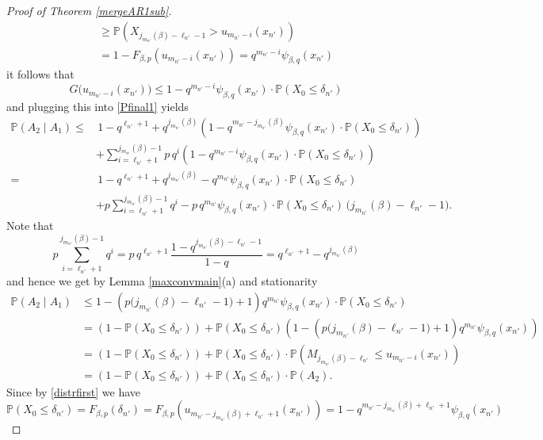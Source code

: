 \documentclass[12pt]{amsart}
\theoremstyle{definition}
\theoremstyle{remark}
\newcommand{\Pm}{{\mathbb P}}
\numberwithin{equation}{section}
\begin{document}
\begin{proof}[Proof of Theorem \ref{mergeAR1sub}]
\begin{align*}
& \quad\geq\Pm\left(X_{j_{m_{n'}}(\beta)-\ell_{n'}-1}>u_{m_{n'}-i}(x_{n'})\right)\\
& \quad=1-F_{\beta,p}(u_{m_{n'}-i}(x_{n'}))=q^{m_{n'}-i}\psi_{\beta,q}(x_{n'})
\end{align*}
it follows that
$$G\big(u_{m_{n'}-i}(x_{n'})\big)\leq 1-q^{m_{n'}-i}\psi_{\beta,q}(x_{n'})\cdot\Pm\left(X_{0}\leq\delta_{n'}\right)$$
and plugging this into \eqref{Pfinal1} yields
\begin{align*}
\Pm(A_2\mid A_1)\leq & \,1-q^{\ell_{n'}+1}+q^{j_{m_{n'}}(\beta)}\left(1-q^{m_{n'}-j_{m_{n'}}(\beta)}\psi_{\beta,q}(x_{n'})\cdot\Pm\left(X_{0}\leq\delta_{n'}\right)\right)\\
& +\sum_{i=\ell_{n'}+1}^{j_{m_{n'}}(\beta)-1} p\,q^i \left(1-q^{m_{n'}-i}\psi_{\beta,q}(x_{n'})\cdot\Pm\left(X_{0}\leq\delta_{n'}\right)\right)\\
= & \,1-q^{\ell_{n'}+1}+q^{j_{m_{n'}}(\beta)}-q^{m_{n'}}\psi_{\beta,q}(x_{n'})\cdot\Pm\left(X_{0}\leq\delta_{n'}\right)\\
& +p\sum_{i=\ell_{n'}+1}^{j_{m_{n'}}(\beta)-1} q^i - p\,q^{m_{n'}} \psi_{\beta,q}(x_{n'})\cdot\Pm\left(X_{0}\leq\delta_{n'}\right)\,\big(j_{m_{n'}}(\beta)-\ell_{n'}-1\big).
\end{align*}
Note that
$$p\sum_{i=\ell_{n'}+1}^{j_{m_{n'}}(\beta)-1} q^i =p\,q^{\ell_{n'}+1}\,\frac{1-q^{j_{m_{n'}}(\beta)-\ell_{n'}-1}}{1-q}=q^{\ell_{n'}+1}-q^{j_{m_{n'}}(\beta)}$$
and hence we get by Lemma \ref{maxconvmain}(a) and stationarity
\begin{align*}
\Pm(A_2\mid A_1) & \leq 1-\left(p\big(j_{m_{n'}}(\beta)-\ell_{n'}-1\big)+1\right)q^{m_{n'}}\psi_{\beta,q}(x_{n'})\cdot\Pm\left(X_{0}\leq\delta_{n'}\right)\\
& =\left(1-\Pm\left(X_{0}\leq\delta_{n'}\right)\right)+\Pm\left(X_{0}\leq\delta_{n'}\right)\left(1-\left(p\big(j_{m_{n'}}(\beta)-\ell_{n'}-1\big)+1\right)q^{m_{n'}}\psi_{\beta,q}(x_{n'})\right)\\
& =\left(1-\Pm\left(X_{0}\leq\delta_{n'}\right)\right)+\Pm\left(X_{0}\leq\delta_{n'}\right)\cdot\Pm\left(M_{j_{m_{n'}}(\beta)-\ell_{n'}}\leq u_{m_{n'}-i}(x_{n'})\right)\\
& =\left(1-\Pm\left(X_{0}\leq\delta_{n'}\right)\right)+\Pm\left(X_{0}\leq\delta_{n'}\right)\cdot\Pm(A_{2}).
\end{align*}
Since by \eqref{distrfirst} we have
$$\Pm\left(X_{0}\leq\delta_{n'}\right)=F_{\beta,p}(\delta_{n'}) = F_{\beta,p}(u_{m_{n'}-j_{m_{n'}}(\beta)+\ell_{n'}+1}(x_{n'}))=1-q^{m_{n'}-j_{m_{n'}}(\beta)+\ell_{n'}+1}\psi_{\beta,q}(x_{n'})$$

\end{proof}
\end{document}
